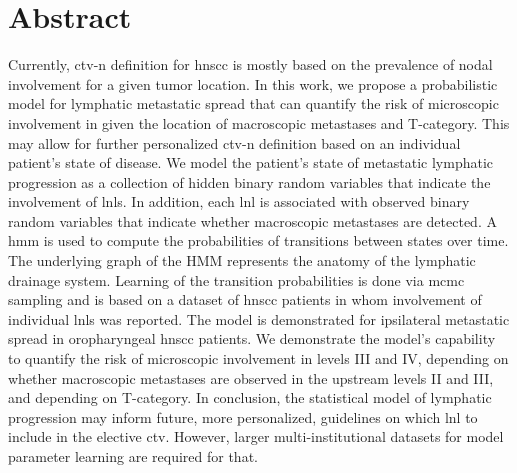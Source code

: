 \documentclass[\relativeRoot/main.tex]{subfiles}
\begin{document}
\section{Abstract}
\label{sec:unilateral:abstract}

Currently, \gls{ctv-n} definition for \gls{hnscc} is mostly based on the prevalence of nodal involvement for a given tumor location. In this work, we propose a probabilistic model for lymphatic metastatic spread that can quantify the risk of microscopic involvement in  given the location of macroscopic metastases and T-category. This may allow for further personalized \gls{ctv-n} definition based on an individual patient's state of disease. We model the patient's state of metastatic lymphatic progression as a collection of hidden binary random variables that indicate the involvement of \glspl{lnl}. In addition, each \gls{lnl} is associated with observed binary random variables that indicate whether macroscopic metastases are detected. A \gls{hmm} is used to compute the probabilities of transitions between states over time. The underlying graph of the HMM represents the anatomy of the lymphatic drainage system. Learning of the transition probabilities is done via \gls{mcmc} sampling and is based on a dataset of \gls{hnscc} patients in whom involvement of individual \glspl{lnl} was reported. The model is demonstrated for ipsilateral metastatic spread in oropharyngeal \gls{hnscc} patients. We demonstrate the model's capability to quantify the risk of microscopic involvement in levels III and IV, depending on whether macroscopic metastases are observed in the upstream levels II and III, and depending on T-category. In conclusion, the statistical model of lymphatic progression may inform future, more personalized, guidelines on which \gls{lnl} to include in the elective \acrshort{ctv}. However, larger multi-institutional datasets for model parameter learning are required for that.
\end{document}
